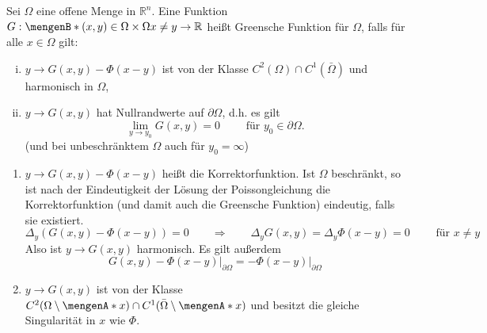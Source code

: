 \begin{definition}
	Sei $\Omega$ eine offene Menge in $\mathbb{R}^n$. 
	Eine Funktion $G : \set[(x,y) \in \Omega \times \Omega]{x \neq y} \to \mathbb{R}$ heißt Greensche Funktion für $\Omega$, falls für alle $x \in \Omega$ gilt:
	\begin{enumerate}[(i)]
		\item $y \to G(x,y)- \Phi(x-y)$ ist von der Klasse $C^2(\Omega) \cap C^1(\bar{\Omega})$ und harmonisch in $\Omega$,
		\item $y \to G(x,y)$ hat Nullrandwerte auf $\partial \Omega$, d.h. es gilt 
		\[
			\lim_{y \to y_0}G(x,y) = 0 \qquad \text{ für } y_0 \in \partial \Omega.
		\]
		(und bei unbeschränktem $\Omega$ auch für $y_0 = \infty$)
	\end{enumerate}
\end{definition}
\begin{bemerkung}
	\begin{enumerate}[1)]
		\item $y \to G(x,y) - \Phi(x-y)$ heißt die Korrektorfunktion. 
		Ist $\Omega$ beschränkt, so ist nach der Eindeutigkeit der Lösung der Poissongleichung die Korrektorfunktion 
		(und damit auch die Greensche Funktion) eindeutig, falls sie existiert.
		\begin{equation}
			\Delta_y ( G(x,y) - \Phi(x-y)) = 0 \qquad  \Rightarrow \qquad \Delta_y G(x,y) = \Delta_y \Phi(x-y) = 0 \qquad \text{ für }x \neq y
		\end{equation}
		Also ist $y \to G(x,y)$ harmonisch. Es gilt außerdem
		\[
			G(x,y) - \Phi(x-y)  \Big|_{\partial \Omega}^{} = - \Phi(x-y)  \Big|_{\partial \Omega}^{}
		\]
		\item $y \to G(x,y)$ ist von der Klasse $C^2(\Omega \setminus \set{x}) \cap C^1( \bar{\Omega} \setminus \set{x})$ und besitzt die gleiche Singularität in $x$
		wie $\Phi$.
	\end{enumerate}
\end{bemerkung}

